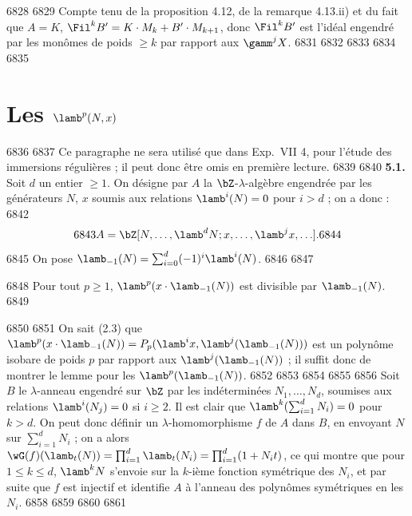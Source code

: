   6828	
  6829		Compte tenu de la proposition 4.12, de la remarque 4.13.ii) et du fait que $A = K$, $\Fil^k B' = K \cdot M_k + B' \cdot M_{k+1}$, donc $\Fil^k B'$ est l'id\'eal engendr\'e par les mon\^omes de poids $\geq k$ par rapport aux $\gamm^j X$.
  6831	
  6832	%
  6833	%
  6834	%
  6835	\section{Les $\lamb^p(N,x)$}
  6836	
  6837		\noindent Ce paragraphe ne sera utilis\'e que dans Exp.~VII 4, pour l'\'etude des immersions r\'eguli\`eres ; il peut donc \^etre omis en premi\`ere lecture.
  6839	
  6840		\noindent\textbf{5.1.} Soit $d$ un entier $\geq 1$. On d\'esigne par $A$ la $\bZ$-$\lambda$-alg\`ebre engendr\'ee par les g\'en\'erateurs $N$, $x$ soumis aux relations $\lamb^i(N) = 0$ pour $i > d$ ; on a donc :
  6842	\[
  6843	A = \bZ[N, \ldots, \lamb^d N; x, \ldots, \lamb^j x, \ldots].
  6844	\]
  6845	On pose $\lamb_{-1}(N) = \sum_{i=0}^{d} (-1)^i \lamb^i(N)$.
  6846	
  6847	\begin{lemme}
  6848	Pour tout $p \geq 1$, $\lamb^p(x \cdot \lamb_{-1}(N))$ est divisible par $\lamb_{-1}(N)$.
  6849	\end{lemme}
  6850	
  6851	On sait (2.3) que $\lamb^p(x \cdot \lamb_{-1}(N)) = P_p(\lamb^i x, \lamb^j(\lamb_{-1}(N)))$ est un polyn\^ome isobare de poids $p$ par rapport aux $\lamb^j(\lamb_{-1}(N))$ ; il suffit donc de montrer le lemme pour les $\lamb^p(\lamb_{-1}(N))$.
  6852	
  6853	%
  6854	%
  6855	%
  6856		Soit $B$ le $\lambda$-anneau engendr\'e sur $\bZ$ par les ind\'etermin\'ees $N_1, \ldots, N_d$, soumises aux relations $\lamb^i(N_j) = 0$ si $i \geq 2$. Il est clair que $\lamb^k(\sum_{i=1}^d N_i) = 0$ pour $k > d$. On peut donc d\'efinir un $\lambda$-homomorphisme $f$ de $A$ dans $B$, en envoyant $N$ sur $\sum_{i=1}^d N_i$ ; on a alors $\wG(f)(\lamb_t(N)) = \prod_{i=1}^d \lamb_t(N_i) = \prod_{i=1}^d(1 + N_i t)$, ce qui montre que pour $1 \leq k \leq d$, $\lamb^k N$ s'envoie sur la $k$-i\`eme fonction sym\'etrique des $N_i$, et par suite que $f$ est injectif et identifie $A$ \`a l'anneau des polyn\^omes sym\'etriques en les $N_i$.
  6858	
  6859	%
  6860	%
  6861	%
